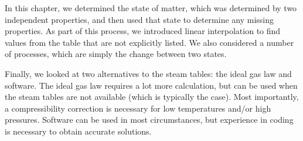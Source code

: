 In this chapter, we determined the state of matter, which was determined by two independent properties, and then used that state to determine any missing properties.  As part of this process, we introduced linear interpolation to find values from the table that are not explicitly listed.  We also considered a number of processes, which are simply the change between two states.

Finally, we looked at two alternatives to the steam tables: the ideal gas law and software.  The ideal gas law requires a lot more calculation, but can be used when the steam tables are not available (which is typically the case).  Most importantly, a compressibility correction is necessary for low temperatures and/or high pressures.  Software can be used in most circumstances, but experience in coding is necessary to obtain accurate solutions.


